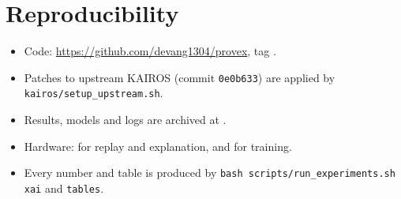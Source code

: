 \documentclass[conference]{IEEEtran}
\begin{document}
\section*{Reproducibility}
\begin{itemize}
\item Code: \url{https://github.com/devang1304/provex}, tag \texttt{\ReleaseTag}.
\item Patches to upstream KAIROS (commit \texttt{0e0b633}) are applied by \texttt{kairos/setup\_upstream.sh}.
\item Results, models and logs are archived at \ReleaseDOI.
\item Hardware: \HardwareCPU{} for replay and explanation, and \HardwareGPU{} for training.
\item Every number and table is produced by \texttt{bash scripts/run\_experiments.sh xai} and
  \texttt{tables}.
\end{itemize}
\end{document}
